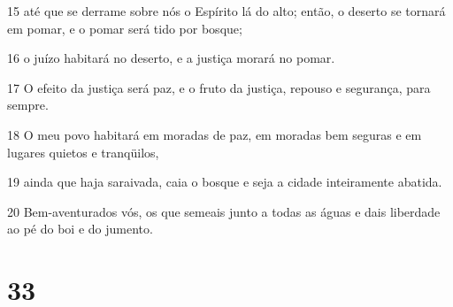 \par 15 até que se derrame sobre nós o Espírito lá do alto; então, o deserto se tornará em pomar, e o pomar será tido por bosque;
\par 16 o juízo habitará no deserto, e a justiça morará no pomar.
\par 17 O efeito da justiça será paz, e o fruto da justiça, repouso e segurança, para sempre.
\par 18 O meu povo habitará em moradas de paz, em moradas bem seguras e em lugares quietos e tranqüilos,
\par 19 ainda que haja saraivada, caia o bosque e seja a cidade inteiramente abatida.
\par 20 Bem-aventurados vós, os que semeais junto a todas as águas e dais liberdade ao pé do boi e do jumento.

\chapter{33}

